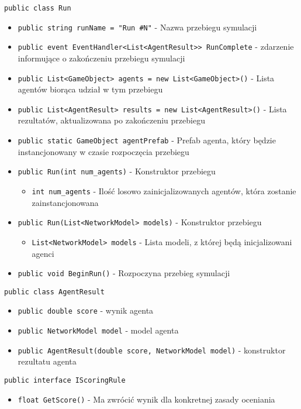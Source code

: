 \documentclass[12pt,a4paper]{article}
\begin{document}
\lstinline{public class Run}
\begin{itemize}
    \item \lstinline|public string runName = "Run #N"| - Nazwa przebiegu symulacji
    \item \lstinline|public event EventHandler<List<AgentResult>> RunComplete| - zdarzenie informujące o zakończeniu przebiegu symulacji
    \item \lstinline|public List<GameObject> agents = new List<GameObject>()| - Lista agentów biorąca udział w tym przebiegu
    \item \lstinline|public List<AgentResult> results = new List<AgentResult>()| - Lista rezultatów, aktualizowana po zakończeniu przebiegu
    \item \lstinline|public static GameObject agentPrefab| - Prefab agenta, który będzie instancjonowany w czasie rozpoczęcia przebiegu
    \item \lstinline|public Run(int num_agents)| - Konstruktor przebiegu
          \begin{itemize}
              \item \lstinline{int num_agents} - Ilość losowo zainicjalizowanych agentów, która zostanie zainstancjonowana
          \end{itemize}
    \item \lstinline|public Run(List<NetworkModel> models)| -  Konstruktor przebiegu
          \begin{itemize}
              \item \lstinline{List<NetworkModel> models} - Lista modeli, z której będą inicjalizowani agenci
          \end{itemize}
    \item \lstinline|public void BeginRun()| - Rozpoczyna przebieg symulacji
\end{itemize}

\lstinline{public class AgentResult}
\begin{itemize}
    \item \lstinline|public double score| - wynik agenta
    \item \lstinline|public NetworkModel model| - model agenta
    \item \lstinline|public AgentResult(double score, NetworkModel model)| - konstruktor rezultatu agenta
\end{itemize}


\lstinline{public interface IScoringRule}
\begin{itemize}
    \item \lstinline|float GetScore()| - Ma zwrócić wynik dla konkretnej zasady oceniania
\end{itemize}
\end{document}
